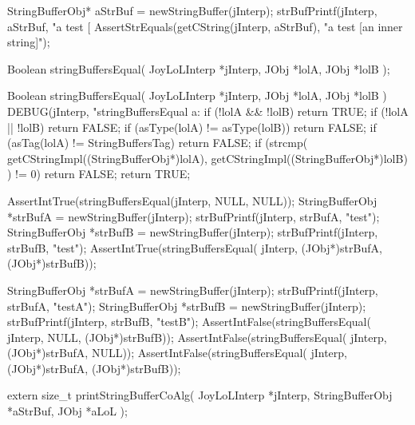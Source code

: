 \startCTest
  StringBufferObj* aStrBuf = newStringBuffer(jInterp);
  strBufPrintf(jInterp, aStrBuf, "a test [%
  AssertStrEquals(getCString(jInterp, aStrBuf), "a test [an inner string]");
\stopCTest
\stopTestCase
\stopTestSuite


\startCHeader
Boolean stringBuffersEqual(
  JoyLoLInterp *jInterp,
  JObj     *lolA,
  JObj     *lolB
);
\stopCHeader

\startCCode
Boolean stringBuffersEqual(
  JoyLoLInterp *jInterp,
  JObj     *lolA,
  JObj     *lolB
) {
  DEBUG(jInterp, "stringBuffersEqual a:%
  if (!lolA && !lolB) return TRUE;
  if (!lolA || !lolB) return FALSE;
  if (asType(lolA) != asType(lolB)) return FALSE;
  if (asTag(lolA)  != StringBuffersTag) return FALSE;
  if (strcmp(
    getCStringImpl((StringBufferObj*)lolA),
    getCStringImpl((StringBufferObj*)lolB)
    ) != 0) return FALSE;
  return TRUE;
}
\stopCCode


\startCTest
  AssertIntTrue(stringBuffersEqual(jInterp, NULL, NULL));
  StringBufferObj *strBufA = newStringBuffer(jInterp);
  strBufPrintf(jInterp, strBufA, "test");
  StringBufferObj *strBufB = newStringBuffer(jInterp);
  strBufPrintf(jInterp, strBufB, "test");
  AssertIntTrue(stringBuffersEqual(
    jInterp, (JObj*)strBufA, (JObj*)strBufB));
\stopCTest
\stopTestCase


\startCTest
  StringBufferObj *strBufA = newStringBuffer(jInterp);
  strBufPrintf(jInterp, strBufA, "testA");
  StringBufferObj *strBufB = newStringBuffer(jInterp);
  strBufPrintf(jInterp, strBufB, "testB");
  AssertIntFalse(stringBuffersEqual(
    jInterp, NULL, (JObj*)strBufB));
  AssertIntFalse(stringBuffersEqual(
    jInterp, (JObj*)strBufA, NULL));
  AssertIntFalse(stringBuffersEqual(
    jInterp, (JObj*)strBufA, (JObj*)strBufB));
\stopCTest
\stopTestCase
\stopTestSuite


\startCHeader
extern size_t printStringBufferCoAlg(
  JoyLoLInterp    *jInterp,
  StringBufferObj *aStrBuf,
  JObj        *aLoL
);
\stopCHeader
{}

